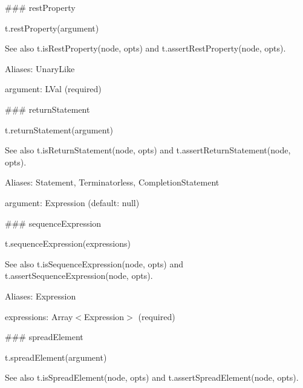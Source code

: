 \#\#\# rest\+Property 
\begin{DoxyCode}
t.restProperty(argument)
\end{DoxyCode}


See also {\ttfamily t.\+is\+Rest\+Property(node, opts)} and {\ttfamily t.\+assert\+Rest\+Property(node, opts)}.

Aliases\+: {\ttfamily Unary\+Like}


\begin{DoxyItemize}
\item {\ttfamily argument}\+: {\ttfamily L\+Val} (required) 


\end{DoxyItemize}

\#\#\# return\+Statement 
\begin{DoxyCode}
t.returnStatement(argument)
\end{DoxyCode}


See also {\ttfamily t.\+is\+Return\+Statement(node, opts)} and {\ttfamily t.\+assert\+Return\+Statement(node, opts)}.

Aliases\+: {\ttfamily Statement}, {\ttfamily Terminatorless}, {\ttfamily Completion\+Statement}


\begin{DoxyItemize}
\item {\ttfamily argument}\+: {\ttfamily Expression} (default\+: {\ttfamily null}) 


\end{DoxyItemize}

\#\#\# sequence\+Expression 
\begin{DoxyCode}
t.sequenceExpression(expressions)
\end{DoxyCode}


See also {\ttfamily t.\+is\+Sequence\+Expression(node, opts)} and {\ttfamily t.\+assert\+Sequence\+Expression(node, opts)}.

Aliases\+: {\ttfamily Expression}


\begin{DoxyItemize}
\item {\ttfamily expressions}\+: {\ttfamily Array$<$Expression$>$} (required) 


\end{DoxyItemize}

\#\#\# spread\+Element 
\begin{DoxyCode}
t.spreadElement(argument)
\end{DoxyCode}


See also {\ttfamily t.\+is\+Spread\+Element(node, opts)} and {\ttfamily t.\+assert\+Spread\+Element(node, opts)}.

